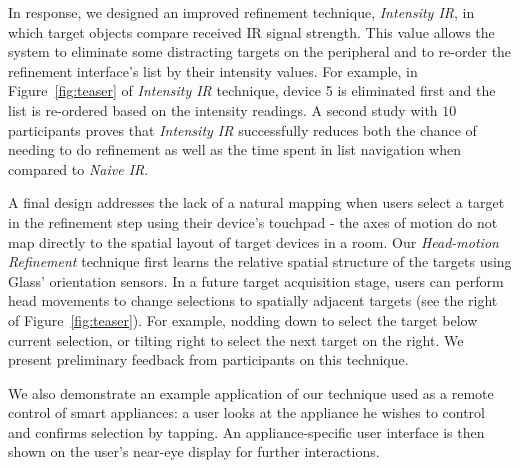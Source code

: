 In response, we designed an improved refinement technique, {\em Intensity IR}, in which target objects compare received IR signal strength. This value allows the system to eliminate some distracting targets on the peripheral and to re-order the refinement interface's list by their intensity values. For example, in Figure~\ref{fig:teaser} of {\em Intensity IR} technique, device 5 is eliminated first and the list is re-ordered based on the intensity readings. A second study with $10$ participants proves that {\em Intensity IR} successfully reduces both the chance of needing to do refinement as well as the time spent in list navigation when compared to {\em Naive IR}.

A final design addresses the lack of a natural mapping when users select a target in the refinement step using their device's touchpad - the axes of motion do not map directly to the spatial layout of target devices in a room. Our {\em Head-motion Refinement} technique first learns the relative spatial structure of the targets using Glass' orientation sensors. In a future target acquisition stage, users can perform head movements to change selections to spatially adjacent targets (see the right of Figure~\ref{fig:teaser}). For example, nodding down to select the target below current selection, or tilting right to select the next target on the right. We present preliminary feedback from participants on this technique.

We also demonstrate an example application of our technique used as a remote control of smart appliances: a user looks at the appliance he wishes to control and confirms selection by tapping. An appliance-specific user interface is then shown on the user's near-eye display for further interactions.






